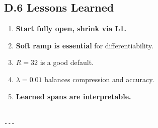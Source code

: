\subsection{D.6 Lessons Learned}

\begin{enumerate}
\item \textbf{Start fully open, shrink via L1.}
\item \textbf{Soft ramp is essential} for differentiability.
\item \textbf{$R = 32$} is a good default.
\item \textbf{$\lambda = 0.01$} balances compression and accuracy.
\item \textbf{Learned spans are interpretable.}
\end{enumerate}
\begin{lstlisting}

---
\end{lstlisting}